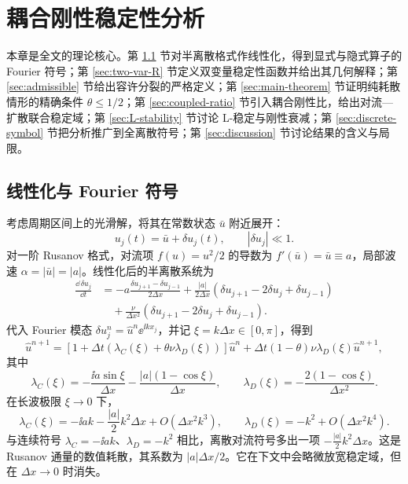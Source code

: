 \chapter{耦合刚性稳定性分析}

本章是全文的理论核心。第 \ref{sec:linearization} 节对半离散格式作线性化，得到显式与隐式算子的 Fourier 符号；第 \ref{sec:two-var-R} 节定义双变量稳定性函数并给出其几何解释；第 \ref{sec:admissible} 节给出容许分裂的严格定义；第 \ref{sec:main-theorem} 节证明纯耗散情形的精确条件 $\theta\le1/2$；第 \ref{sec:coupled-ratio} 节引入耦合刚性比，给出对流—扩散联合稳定域；第 \ref{sec:L-stability} 节讨论 L-稳定与刚性衰减；第 \ref{sec:discrete-symbol} 节把分析推广到全离散符号；第 \ref{sec:discussion} 节讨论结果的含义与局限。

\section{线性化与 Fourier 符号}
\label{sec:linearization}

考虑周期区间上的光滑解，将其在常数状态 $\bar u$ 附近展开：
\begin{equation}
  u_j(t)=\bar u+\delta u_j(t),\qquad |\delta u_j|\ll1.
\end{equation}
对一阶 Rusanov 格式，对流项 $f(u)=u^2/2$ 的导数为 $f'(\bar u)=\bar u\equiv a$，局部波速 $\alpha=|\bar u|=|a|$。线性化后的半离散系统为
\begin{equation}
\begin{split}
  \frac{\dd\,\delta u_j}{\dd t}
  &=-a\frac{\delta u_{j+1}-\delta u_{j-1}}{2\Delta x}
  +\frac{|a|}{2\Delta x}\left(\delta u_{j+1}-2\delta u_j+\delta u_{j-1}\right)\\
  &\quad+\frac{\nu}{\Delta x^2}\left(\delta u_{j+1}-2\delta u_j+\delta u_{j-1}\right).
\end{split}
  \label{eq:linearized-scheme}
\end{equation}
代入 Fourier 模态 $\delta u_j^n=\hat u^n\ee^{\ii kx_j}$，并记 $\xi=k\Delta x\in[0,\pi]$，得到
\begin{equation}
  \hat u^{n+1}=\left[1+\Delta t\left(\lambda_C(\xi)+\theta\nu\lambda_D(\xi)\right)\right]\hat u^n
  +\Delta t(1-\theta)\nu\lambda_D(\xi)\hat u^{n+1},
  \label{eq:fourier-imex}
\end{equation}
其中
\begin{equation}
  \lambda_C(\xi)=-\frac{\ii a\sin\xi}{\Delta x}
  -\frac{|a|(1-\cos\xi)}{\Delta x},
  \qquad
  \lambda_D(\xi)=-\frac{2(1-\cos\xi)}{\Delta x^2}.
  \label{eq:symbols}
\end{equation}
在长波极限 $\xi\to0$ 下，
\begin{equation}
  \lambda_C(\xi)=-\ii ak-\frac{|a|}{2}k^2\Delta x+O(\Delta x^2k^3),
  \qquad
  \lambda_D(\xi)=-k^2+O(\Delta x^2k^4).
  \label{eq:symbols-long-wave}
\end{equation}
与连续符号 $\lambda_C=-\ii ak$、$\lambda_D=-k^2$ 相比，离散对流符号多出一项 $-\frac{|a|}{2}k^2\Delta x$。这是 Rusanov 通量的数值耗散，其系数为 $|a|\Delta x/2$。它在下文中会略微放宽稳定域，但在 $\Delta x\to0$ 时消失。

